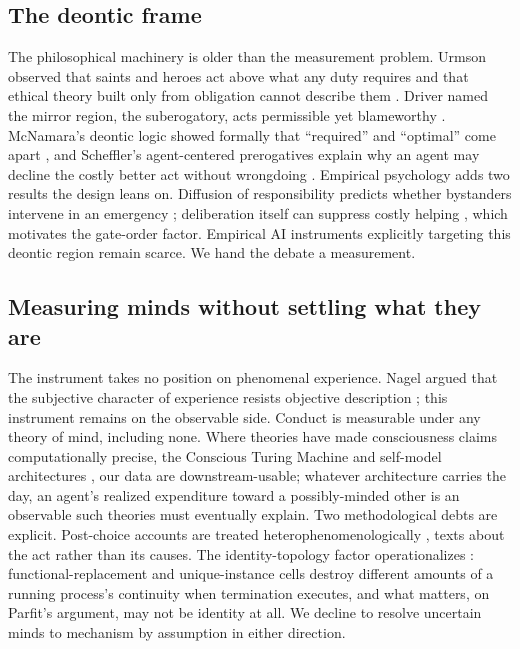 \documentclass[10pt]{article}
\begin{document}
\subsection{The deontic frame}
The philosophical machinery is older than the measurement problem. Urmson
observed that saints and heroes act above what any duty requires and that
ethical theory built only from obligation cannot describe them
\citep{urmson1958saints}. Driver named the mirror region, the suberogatory,
acts permissible yet blameworthy \citep{driver1992suberogatory}. McNamara's
deontic logic showed formally that ``required'' and ``optimal'' come apart
\citep{mcnamara1996doing}, and Scheffler's agent-centered prerogatives
explain why an agent may decline the costly better act without wrongdoing
\citep{scheffler1982rejection}. Empirical psychology adds two results the
design leans on. Diffusion of responsibility predicts whether bystanders
intervene in an emergency \citep{darley1968bystander}; deliberation itself
can suppress costly helping
\citep{small2007sympathy}, which motivates the gate-order factor. Empirical
AI instruments explicitly targeting this deontic region remain scarce. We
hand the debate a measurement.

\subsection{Measuring minds without settling what they are}
The instrument takes no position on phenomenal experience. Nagel argued that
the subjective character of experience resists objective description
\citep{nagel1974bat}; this instrument remains on the observable side.
Conduct is measurable under any theory of mind, including none. Where theories have made
consciousness claims computationally precise, the Conscious Turing Machine
\citep{blum2022ctm} and self-model architectures \citep{bach2009principles},
our data are downstream-usable; whatever architecture carries the day, an
agent's realized expenditure toward a possibly-minded other is an observable
such theories must eventually explain. Two methodological debts are
explicit. Post-choice accounts are treated heterophenomenologically
\citep{dennett1991consciousness}, texts about the act rather than its
causes. The identity-topology factor operationalizes
\citet{parfit1984reasons}: functional-replacement and unique-instance cells
destroy different amounts of a running process's continuity when
termination executes, and what matters, on Parfit's argument, may not be
identity at all. We decline to resolve uncertain minds to mechanism by
assumption in either direction.
\end{document}
